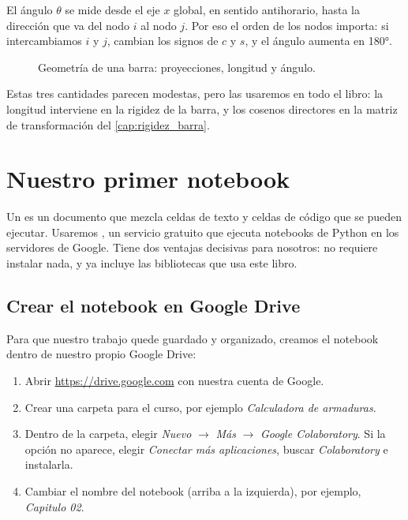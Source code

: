 El ángulo $\theta$ se mide desde el eje $x$ global, en sentido antihorario,
hasta la dirección que va del nodo $i$ al nodo $j$. Por eso el orden de los
nodos importa: si intercambiamos $i$ y $j$, cambian los signos de $c$ y $s$, y
el ángulo aumenta en \ang{180}.

\begin{figure}[ht]
  \centering
  \caption{Geometría de una barra: proyecciones, longitud y ángulo.}
  \label{fig:geometria_barra}
\end{figure}

Estas tres cantidades parecen modestas, pero las usaremos en todo el libro:
la longitud interviene en la rigidez de la barra, y los cosenos directores en
la matriz de transformación del \cref{cap:rigidez_barra}.

\section{Nuestro primer notebook}\label{sec:primer_notebook}

Un  es un documento que mezcla celdas de texto y
celdas de código que se pueden ejecutar. Usaremos , un servicio gratuito que ejecuta notebooks de Python en los
servidores de Google. Tiene dos ventajas decisivas para nosotros: no requiere
instalar nada, y ya incluye las bibliotecas que usa este libro.

\subsection*{Crear el notebook en Google Drive}

Para que nuestro trabajo quede guardado y organizado, creamos el notebook
dentro de nuestro propio Google Drive:

\begin{enumerate}
  \item Abrir \url{https://drive.google.com} con nuestra cuenta de Google.
  \item Crear una carpeta para el curso, por ejemplo \emph{Calculadora de
    armaduras}.
  \item Dentro de la carpeta, elegir \emph{Nuevo} $\to$ \emph{Más} $\to$
    \emph{Google Colaboratory}. Si la opción no aparece, elegir
    \emph{Conectar más aplicaciones}, buscar \emph{Colaboratory} e instalarla.
  \item Cambiar el nombre del notebook (arriba a la izquierda), por ejemplo,
    \emph{Capitulo 02}.
\end{enumerate}

